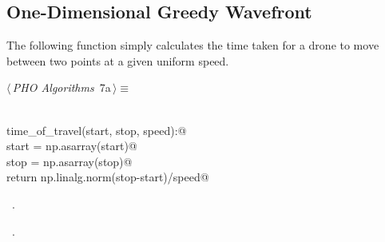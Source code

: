 \documentclass[12.0pt]{report}
\begin{document}
\subsection{One-Dimensional Greedy Wavefront} \hspace{10mm}

The following function simply calculates the time taken for a drone to move between two points at a given uniform speed. 


\begin{flushleft} \small
\begin{minipage}{\linewidth}\label{scrap2}\raggedright\small
{} $\langle\,${\itshape PHO Algorithms}\nobreak\ {\footnotesize {7a}}$\,\rangle\equiv$
\vspace{-1ex}
\begin{list}{}{} \item
\mbox{}\verb@@\\
\mbox{}\verb@def time_of_travel(start, stop, speed):@\\
\mbox{}\verb@     start = np.asarray(start)@\\
\mbox{}\verb@     stop  = np.asarray(stop)@\\
\mbox{}\verb@     return np.linalg.norm(stop-start)/speed@\\
\mbox{}\verb@@{\NWsep}
\end{list}
\vspace{-1.5ex}
\footnotesize
\begin{list}{}{\setlength{\itemsep}{-\parsep}\setlength{\itemindent}{-\leftmargin}}
\item \NWtxtMacroDefBy\ .
\item \NWtxtMacroRefIn\ .

\item{}
\end{list}
\end{minipage}\vspace{4ex}
\end{flushleft}
\end{document}
